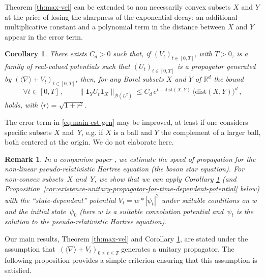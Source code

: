 \documentclass[12pt]{article}
\newcommand{\jnabla}{{\langle\nabla\rangle}}
\newcommand{\dXY}{{\mathrm{dist}(X,Y)}}
\theoremstyle{plain}
\newtheorem{cor}[theo]{Corollary}
\newtheorem{rem}[theo]{Remark}
\begin{document}
Theorem \ref{th:max-vel} can be extended to non necessarily convex subsets $X$ and $Y$ at the price of losing the sharpness of the exponential decay: an additional multiplicative constant and a polynomial term in the distance between $X$ and $Y$ appear in the error term.
\begin{cor}\label{cor:max-vel-bounds-general-subsets}There exists $C_d>0$ such that, if   $(V_t)_{t\in[0,T]}$, with $T>0$, is a family of real-valued potentials such that $(U_t)_{t\in[0,T]}$ is a propagator generated by $(\langle\nabla\rangle+V_t)_{t\in[0,T]}$, then, for any Borel subsets  $X$ and $Y$ of $\mathbb{R}^{d}$ the bound
\begin{equation}\label{eq:main-est-gen}
\forall t\in[0,T]\,,\qquad \|\mathbf{1}_{Y}U_{t}\mathbf{1}_{X}\|_{\mathcal{B}(L^{2})}\leq C_{d} \, e^{t-\dXY} \,  \langle\dXY\rangle^{d}\,,
\end{equation}
holds, with $\langle r \rangle = \sqrt{1+r^2}$.
\end{cor}

The error term in \eqref{eq:main-est-gen} may be improved, at least if one considers specific subsets $X$ and~$Y$, e.g. if $X$ is a ball and $Y$ the complement of a larger ball, both centered at the origin. We do not elaborate here.



\begin{rem}In a companion paper \cite{BFG2b}, we estimate the speed of propagation for the non-linear pseudo-relativistic Hartree equation (the boson star equation). For non-convex subsets~$X$ and~$Y$, we show that we can apply Corollary \ref{cor:max-vel-bounds-general-subsets} (and Proposition~\ref{cor:existence-unitary-propagator-for-time-dependent-potential} below) with the ``state-dependent'' potential $V_t=w*|\psi_t|^2$ under suitable conditions on $w$ and the initial state~$\psi_0$ (here $w$ is a suitable convolution potential and~$\psi_t$ is the solution to the pseudo-relativistic Hartree equation).
\end{rem}


Our main results, Theorem \ref{th:max-vel} and Corollary \ref{cor:max-vel-bounds-general-subsets}, are stated under the assumption that~$(\jnabla+V_t)_{0\le t\le T}$ generates a unitary propagator. The following proposition provides a simple criterion ensuring that this assumption is satisfied. 
\end{document}
